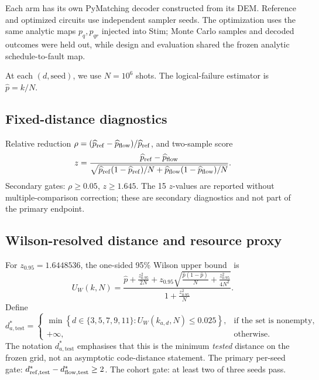 \documentclass[11pt]{article}
\begin{document}
Each arm has its own PyMatching decoder constructed from its DEM. Reference and optimized circuits use independent sampler seeds. The optimization uses the same analytic maps \(p_q, p_{qr}\) injected into Stim; Monte Carlo samples and decoded outcomes were held out, while design and evaluation shared the frozen analytic schedule-to-fault map.

At each \((d,\text{seed})\), we use \(N=10^6\) shots. The logical-failure estimator is \(\widehat p=k/N\).

\subsection{Fixed-distance diagnostics}

Relative reduction \(\rho=(\widehat p_{\rm ref}-\widehat p_{\rm flow})/\widehat p_{\rm ref}\), and two-sample score
\begin{equation}
  z=\frac{\widehat p_{\rm ref}-\widehat p_{\rm flow}}
  {\sqrt{\widehat p_{\rm ref}(1-\widehat p_{\rm ref})/N+
         \widehat p_{\rm flow}(1-\widehat p_{\rm flow})/N}}.
  \label{eq:z}
\end{equation}
Secondary gates: \(\rho\ge0.05\), \(z\ge1.645\). The 15 \(z\)-values are reported without multiple-comparison correction; these are secondary diagnostics and not part of the primary endpoint.

\subsection{Wilson-resolved distance and resource proxy}

For \(z_{0.95}=1.6448536\), the one-sided 95\% Wilson upper bound~\cite{Wilson1927} is
\begin{equation}
  U_W(k,N)=
  \frac{\widehat p+\frac{z_{0.95}^2}{2N}
  +z_{0.95}\sqrt{\frac{\widehat p(1-\widehat p)}{N}
  +\frac{z_{0.95}^2}{4N^2}}}
  {1+\frac{z_{0.95}^2}{N}}.
  \label{eq:wilson}
\end{equation}
Define
\begin{equation}
  d_{a,\mathrm{test}}^*
  =
  \begin{cases}
  \min\left\{d\in\{3,5,7,9,11\}:
  U_W(k_{a,d},N)\leq0.025\right\},
  & \text{if the set is nonempty},\\[4pt]
  +\infty,
  & \text{otherwise}.
  \end{cases}
  \label{eq:dstar}
\end{equation}
The notation \(d_{a,\mathrm{test}}^*\) emphasises that this is the minimum \emph{tested} distance on the frozen grid, not an asymptotic code-distance statement. The primary per-seed gate: \(d_{{\rm ref},\mathrm{test}}^*-d_{{\rm flow},\mathrm{test}}^*\ge2\). The cohort gate: at least two of three seeds pass.
\end{document}
